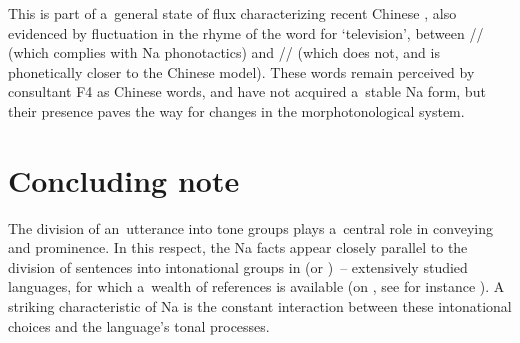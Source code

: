 This is part of a~general state of flux characterizing recent Chinese , also evidenced by fluctuation in the rhyme of the word for ‘television’, between // (which complies with Na phonotactics) and // (which does not, and is phonetically closer to the Chinese model). These words remain perceived by consultant F4 as Chinese words, and have not acquired a~stable Na form, but their presence paves the way for changes in the morphotonological system.

\section{Concluding note}
\label{sec:concludingremark}

The division of an~utterance into tone groups plays a~central role in conveying  and
prominence. In this respect, the Na facts appear closely parallel to the division of
sentences into intonational groups in  (or )~-- extensively studied languages, for which a~wealth of references is available (on , see for instance \citealt{vaissiere1975,dicristo1998,rossi1999,martin2015}). A
striking characteristic of Na is the constant interaction between these intonational choices and the
language’s tonal processes.

